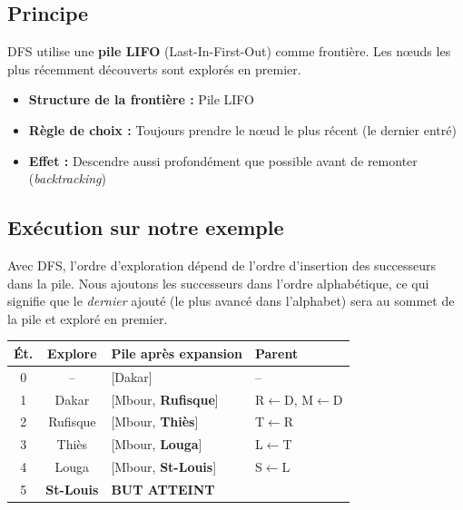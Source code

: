 \documentclass[11pt,a4paper]{article}
\begin{document}
\subsection{Principe}

DFS utilise une \textbf{pile LIFO} (Last-In-First-Out) comme frontière. Les nœuds les plus récemment découverts sont explorés en premier.

\begin{recipebox}
\begin{itemize}
    \item \textbf{Structure de la frontière :} Pile LIFO
    \item \textbf{Règle de choix :} Toujours prendre le nœud le plus récent (le dernier entré)
    \item \textbf{Effet :} Descendre aussi profondément que possible avant de remonter (\textit{backtracking})
\end{itemize}
\end{recipebox}

\subsection{Exécution sur notre exemple}

Avec DFS, l'ordre d'exploration dépend de l'ordre d'insertion des successeurs dans la pile. Nous ajoutons les successeurs dans l'ordre alphabétique, ce qui signifie que le \textit{dernier} ajouté (le plus avancé dans l'alphabet) sera au sommet de la pile et exploré en premier.

{\small
\begin{center}
\begin{tabular}{|c|c|l|l|}
\hline
\textbf{Ét.} & \textbf{Explore} & \textbf{Pile après expansion} & \textbf{Parent} \\
\hline
0 & -- & [Dakar] & -- \\
1 & Dakar & [Mbour, \textbf{Rufisque}] & R$\leftarrow$D, M$\leftarrow$D \\
2 & Rufisque & [Mbour, \textbf{Thiès}] & T$\leftarrow$R \\
3 & Thiès & [Mbour, \textbf{Louga}] & L$\leftarrow$T \\
4 & Louga & [Mbour, \textbf{St-Louis}] & S$\leftarrow$L \\
5 & \textbf{St-Louis} & \textbf{BUT ATTEINT} & \\
\hline
\end{tabular}
\end{center}
}
\end{document}

